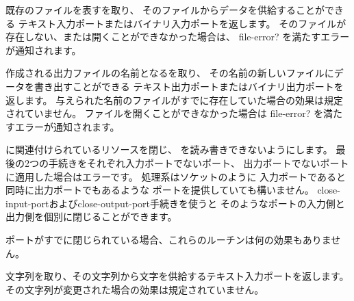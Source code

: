 \begin{entry}{%
}
 
既存のファイルを表すを取り、
そのファイルからデータを供給することができる
テキスト入力ポートまたはバイナリ入力ポートを返します。
そのファイルが存在しない、または開くことができなかった場合は、
{\cf file-error?} を満たすエラーが通知されます。

\end{entry}


\begin{entry}{%
}

作成される出力ファイルの名前となるを取り、
その名前の新しいファイルにデータを書き出すことができる
テキスト出力ポートまたはバイナリ出力ポートを返します。
与えられた名前のファイルがすでに存在していた場合の効果は規定されていません。
ファイルを開くことができなかった場合は
{\cf file-error?} を満たすエラーが通知されます。

\end{entry}


\begin{entry}{%
}

に関連付けられているリソースを閉じ、
を読み書きできないようにします。
最後の2つの手続きをそれぞれ入力ポートでないポート、
出力ポートでないポートに適用した場合はエラーです。
処理系はソケットのように
入力ポートであると同時に出力ポートでもあるような
ポートを提供していても構いません。
{\cf close-input-port}および{\cf close-output-port}手続きを使うと
そのようなポートの入力側と出力側を個別に閉じることができます。

ポートがすでに閉じられている場合、これらのルーチンは何の効果もありません。


\end{entry}

\begin{entry}{%
}

文字列を取り、その文字列から文字を供給するテキスト入力ポートを返します。
その文字列が変更された場合の効果は規定されていません。

\end{entry}

